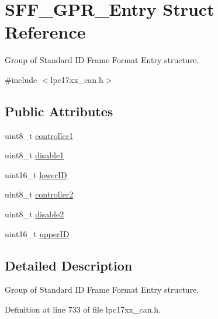 \hypertarget{struct_s_f_f___g_p_r___entry}{\section{\-S\-F\-F\-\_\-\-G\-P\-R\-\_\-\-Entry \-Struct \-Reference}
\label{struct_s_f_f___g_p_r___entry}
}


\-Group of \-Standard \-I\-D \-Frame \-Format \-Entry structure.  




{\ttfamily \#include $<$lpc17xx\-\_\-can.\-h$>$}

\subsection*{\-Public \-Attributes}
\begin{DoxyCompactItemize}
\item 
uint8\-\_\-t \hyperlink{struct_s_f_f___g_p_r___entry_a2a7cc277bbca3ca888c56e7316f5fe3a}{controller1}
\item 
uint8\-\_\-t \hyperlink{struct_s_f_f___g_p_r___entry_af011b69c1031f768f0133a53cb0e90f1}{disable1}
\item 
uint16\-\_\-t \hyperlink{struct_s_f_f___g_p_r___entry_ab22386a244c94c4025b84c8bb56e1e8f}{lower\-I\-D}
\item 
uint8\-\_\-t \hyperlink{struct_s_f_f___g_p_r___entry_ad0104c04d051b181f35ccb6693c8d075}{controller2}
\item 
uint8\-\_\-t \hyperlink{struct_s_f_f___g_p_r___entry_af9be712f7455759474a4687001da2604}{disable2}
\item 
uint16\-\_\-t \hyperlink{struct_s_f_f___g_p_r___entry_af1ec5d8c4fb3edd4e1191fa19fd4eced}{upper\-I\-D}
\end{DoxyCompactItemize}


\subsection{\-Detailed \-Description}
\-Group of \-Standard \-I\-D \-Frame \-Format \-Entry structure. 

\-Definition at line 733 of file lpc17xx\-\_\-can.\-h.



